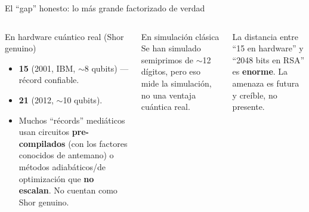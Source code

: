 \documentclass[aspectratio=169]{beamer}
\begin{document}
\begin{frame}{El ``gap'' honesto: lo más grande factorizado de verdad}
  \begin{columns}[T]
    \begin{alertblock}{En hardware cuántico real (Shor genuino)}
      \begin{itemize}\small
        \item \textbf{15} (2001, IBM, $\sim$8 qubits) — récord confiable.
        \item \textbf{21} (2012, $\sim$10 qubits).
        \item Muchos ``récords'' mediáticos usan circuitos
              \textbf{pre-compilados} (con los factores conocidos de antemano)
              o métodos adiabáticos/de optimización que \textbf{no escalan}.
              No cuentan como Shor genuino.
      \end{itemize}
    \end{alertblock}

    \begin{exampleblock}{En simulación clásica}
      \small Se han simulado semiprimos de $\sim$12 dígitos, pero eso
      mide la simulación, no una ventaja cuántica real.
    \end{exampleblock}

    \begin{block}{}
      \small La distancia entre ``15 en hardware'' y ``2048 bits en RSA''
      es \textbf{enorme}. La amenaza es futura y creíble, no presente.
    \end{block}
  \end{columns}

\end{frame}
\end{document}
